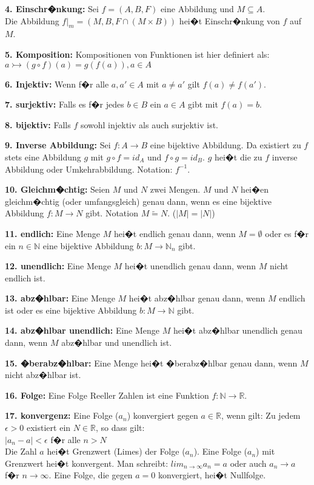 \textbf{4. Einschr�nkung:} Sei $f = (A,B,F)$ eine Abbildung und $M \subseteq A$.\\
Die Abbildung $f|_m = (M,B,F \cap (M \times B))$ hei�t Einschr�nkung von $f$ auf $M$.

\textbf{5. Komposition:} Kompositionen von Funktionen ist hier definiert als: $a \rightarrowtail (g \circ f)(a) = g(f(a)), a \in A$

\textbf{6. Injektiv:} Wenn f�r alle $a,a' \in A$ mit $a \neq a'$ gilt $f(a) \neq f(a')$.

\textbf{7. surjektiv:} Falls es f�r jedes $b \in B$ ein $a \in A$ gibt mit $f(a) = b$.

\textbf{8. bijektiv:} Falls $f$ sowohl injektiv als auch surjektiv ist.

\textbf{9. Inverse Abbildung:} Sei $f : A \rightarrow B$ eine bijektive Abbildung. Da existiert zu $f$ stets eine Abbildung $g$ mit $g \circ f = id_A$ und $f \circ g = id_B$.
$g$ hei�t die zu $f$ inverse Abbildung oder Umkehrabbildung. Notation: $f^{-1}$.

\textbf{10. Gleichm�chtig:} Seien $M$ und $N$ zwei Mengen. $M$ und $N$ hei�en gleichm�chtig (oder umfangsgleich) genau dann, wenn es eine bijektive Abbildung $f : M \rightarrow N$ gibt. Notation $M \tilde{=} N$. ($|M| = |N|$)

\textbf{11. endlich:} Eine Menge $M$ hei�t endlich genau dann, wenn $M = \emptyset$ oder es f�r ein $n \in \mathbb{N}$ eine bijektive Abbildung $b : M \rightarrow \mathbb{N}_n$ gibt.

\textbf{12. unendlich:} Eine Menge $M$ hei�t unendlich genau dann, wenn $M$ nicht endlich ist.

\textbf{13. abz�hlbar:} Eine Menge $M$ hei�t abz�hlbar genau dann, wenn $M$ endlich ist oder es eine bijektive Abbildung $b : M \rightarrow \mathbb{N}$ gibt.

\textbf{14. abz�hlbar unendlich:} Eine Menge $M$ hei�t abz�hlbar unendlich genau dann, wenn $M$ abz�hlbar und unendlich ist.

\textbf{15. �berabz�hlbar:} Eine Menge hei�t �berabz�hlbar genau dann, wenn $M$ nicht abz�hlbar ist.

\textbf{16. Folge:} Eine Folge Reeller Zahlen ist eine Funktion $ f : \mathbb{N} \rightarrow \mathbb{R}$.

\textbf{17. konvergenz:} Eine Folge ($a_n$) konvergiert gegen $a \in \mathbb{R}$, wenn gilt: Zu jedem $\epsilon > 0$ existiert ein $N \in \mathbb{R}$, so dass gilt:\\
$|a_n - a| < \epsilon$ f�r alle $n > N$\\
Die Zahl $a$ hei�t Grenzwert (Limes) der Folge ($a_n$). Eine Folge ($a_n$) mit Grenzwert hei�t konvergent.
Man schreibt: $lim_{n\rightarrow \infty} a_n = a$ oder auch $a_n \rightarrow a$ f�r $n \rightarrow \infty$.
Eine Folge, die gegen $a = 0$ konvergiert, hei�t Nullfolge.

